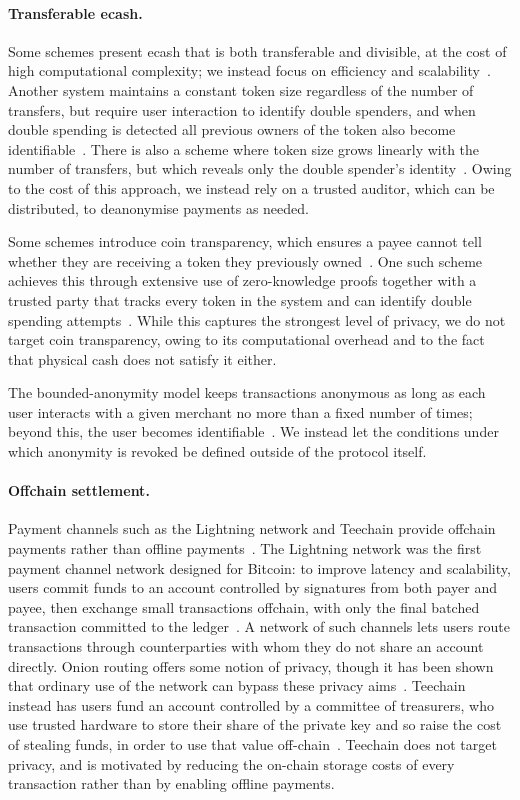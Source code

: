 \paragraph{Transferable ecash.} Some schemes present ecash that is both
transferable and divisible, at the cost of high computational complexity; we
instead focus on efficiency and scalability~\cite{C:OkaOht91,EC:ChaPed92}.
Another system maintains a constant token size regardless of
the number of transfers, but require user interaction to identify double
spenders, and when double spending is detected all previous owners of the
token also become identifiable~\cite{CANS:FucPoiVer09}. 
There is also a scheme where token size grows linearly with the number of
transfers, but which reveals only the double spender's
identity~\cite{PKC:BCFK15}. Owing to the cost of this approach, we instead
rely on a trusted auditor, which can be distributed, to deanonymise payments
as needed.

Some schemes introduce coin transparency, which ensures a payee
cannot tell whether they are receiving a token they previously
owned~\cite{ACNS:CanGou08,PKC:BauFucQia21}. One such scheme achieves this
through extensive use of zero-knowledge proofs together with a trusted party
that tracks every token in the system and can identify double spending
attempts~\cite{AFRICACRYPT:BCFGST11}. While this captures the strongest level of
privacy, we do not target coin transparency, owing to its computational
overhead and to the fact that physical cash does not satisfy it either.

The bounded-anonymity model keeps
transactions anonymous as long as each user interacts with a given merchant no
more than a fixed number of times; beyond this, the user becomes
identifiable~\cite{SCN:CamHohLys06}.
We instead let the conditions under which anonymity is revoked be defined
outside of the protocol itself.

\paragraph{Offchain settlement.} Payment channels such as the Lightning
network and Teechain provide offchain payments rather than offline
payments~\cite{poon2016bitcoin,lind2019teechain}. The Lightning network was
the first payment channel network designed for
Bitcoin: to improve latency and scalability, users
commit funds to an account controlled by signatures from both payer and
payee, then exchange small transactions offchain, with only the final
batched transaction committed to the ledger~\cite{poon2016bitcoin}. A network of such channels lets
users route transactions through counterparties with whom they do not share
an account directly. Onion routing offers some notion of privacy, though it
has been shown that ordinary use of the network can bypass these privacy
aims~\cite{FC:KYPKDM21}. Teechain instead has users fund an account
controlled by a committee of treasurers, who use trusted hardware to store
their share of the private key and so raise the cost of stealing funds, in
order to use that value off-chain~\cite{lind2019teechain}. Teechain does not
target privacy, and is motivated by reducing the on-chain storage costs of
every transaction rather than by enabling offline payments.

